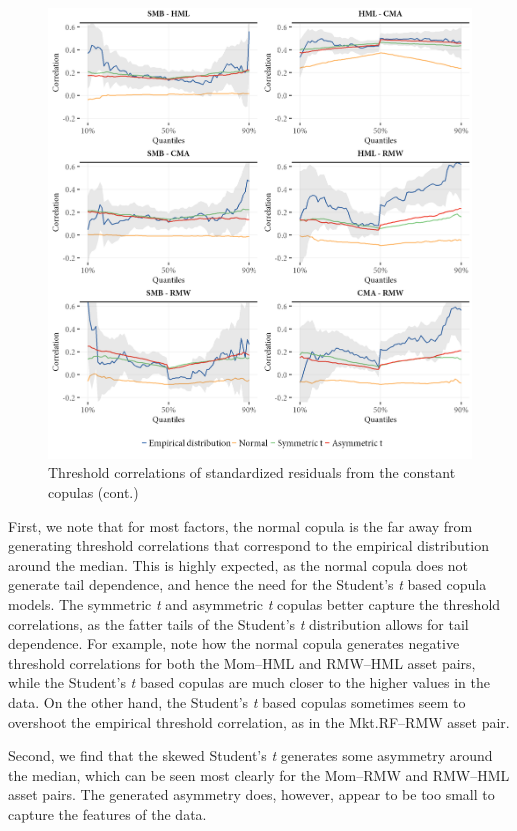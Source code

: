 \begin{figure}[!ht]
  \ContinuedFloat
  \centering
  \caption{Threshold correlations of standardized residuals from the constant copulas (cont.)}
  \includegraphics[scale=1]{graphics/threshold_simulated_2.png}  
\end{figure}
\pagebreak

First, we note that for most factors, the normal copula is the far away from generating threshold correlations that correspond to the empirical distribution around the median. This is highly expected, as the normal copula does not generate tail dependence, and hence the need for the Student's \textit{t} based copula models. The symmetric \textit{t} and asymmetric \textit{t} copulas better capture the threshold correlations, as the fatter tails of the Student's \textit{t} distribution allows for tail dependence. For example, note how the normal copula generates negative threshold correlations for both the Mom--HML and RMW--HML asset pairs, while the Student's \textit{t} based copulas are much closer to the higher values in the data. On the other hand, the Student's \textit{t} based copulas sometimes seem to overshoot the empirical threshold correlation, as in the Mkt.RF--RMW asset pair.

Second, we find that the skewed Student's \textit{t} generates some asymmetry around the median, which can be seen most clearly for the Mom--RMW and RMW--HML asset pairs. The generated asymmetry does, however, appear to be too small to capture the features of the data.

